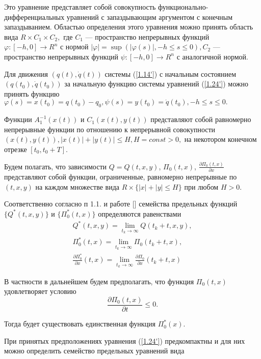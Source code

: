 Это уравнение представляет собой совокупность функционально-дифференциальных уравнений с запаздывающим аргументом с конечным запаздыванием. Областью определения этого уравнения можно принять область вида $R \times C_1 \times C_2,$ где $C_1$ --- пространство непрерывных функций $\varphi : [-h, 0] \to R^n$ с нормой $\left| \varphi \right| = \sup (\left| \varphi(s) \right|, -h \le s \le 0), C_2$ --- пространство непрерывных функций $\psi : [-h, 0] \to R^n$ с аналогичной нормой.

Для движения $(q(t), \dot q(t))$ системы (\ref{1.14'}) с начальным состоянием $(q(t_0), \dot q(t_0))$ за начальную функцию системы уравнений (\ref{1.24'}) можно принять функцию $\varphi (s) = x(t_0) = q(t_0) - q_0, \psi (s) = y(t_0) = \dot q (t_0), -h \le s \le 0.$

Функции $A_1^{-1} (x(t))$ и $C_1(x(t), y(t))$ представляют собой равномерно непрерывные функции по отношению к непрерывной совокупности $(x(t), y(t)), \left| x(t) \right| + \left| y(t) \right| \le H, H = const > 0,$ на некотором конечном отрезке $[t_0, t_0 + T].$

Будем полагать, что зависимости $Q = Q(t, x, y)$, $\Pi_0 (t, x)$, $\frac{\partial \Pi_0 (t, x)}{\partial x}$ представляют собой функции, ограниченные, равномерно непрерывные по $(t, x, y)$ на каждом множестве вида $R \times \lbrace \left| x \right| + \left| y \right| \le H \rbrace$ при любом $H > 0.$

Соответственно согласно п 1.1. и работе [] семейства предельных функций $\lbrace Q^{*} (t, x, y) \rbrace$ и $\lbrace \Pi_0^{*} (t, x) \rbrace$ определяются равенствами 
$$\begin{array}{c}
	\displaystyle Q^{*} (t, x, y) = \lim_{t_k \to \infty} Q(t_k + t, x, y),\\
	\displaystyle \Pi_0^{*} (t, x) = \lim_{t_k \to \infty} \Pi_0 (t_k + t, x),\\ 
	\displaystyle \frac{\partial \Pi_0^{*}}{\partial x} (t, x) = \lim_{t_k \to \infty} \frac{\partial \Pi_0}{\partial x} (t_k + t, x)
\end{array}$$

В частности в дальнейшем будем предполагать, что функция $\Pi_0 (t, x)$ удовлетворяет условию
\begin{equation} \label{1.25_1'}
\frac{\partial \Pi_0 (t, x)}{\partial t} \le 0.
\end{equation}

Тогда будет существовать единственная функция $\Pi_0^{*} (x)$.

При принятых предположениях уравнения (\ref{1.24'}) предкомпактны и для них можно определить семейство предельных уравнений вида 

